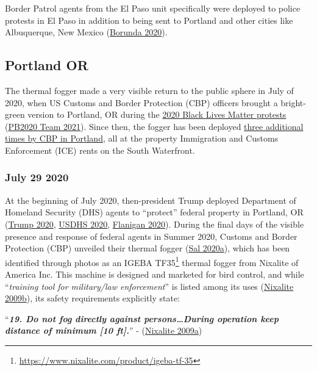 \documentclass[
  11pt,
]{krantz}
\renewenvironment{quote}{\begin{VF}}{\end{VF}}
\renewcommand{\href}[2]{#2\footnote{\url{#1}}}
\begin{document}
Border Patrol agents from the El Paso unit specifically were deployed to police protests in El Paso in addition to being sent to Portland and other cities like Albuquerque, New Mexico (\protect\hyperlink{ref-Borunda2020}{Borunda 2020}).

\hypertarget{PortlandOR2020_2021}{%
\subsection{Portland OR}\label{PortlandOR2020_2021}}

The thermal fogger made a very visible return to the public sphere in July of 2020, when US Customs and Border Protection (CBP) officers brought a bright-green version to Portland, OR during the \protect\hyperlink{PortlandOR2020_07_29}{2020 Black Lives Matter protests} (\protect\hyperlink{ref-pb20202021}{PB2020 Team 2021}).
Since then, the fogger has been deployed \protect\hyperlink{PortlandORICE2020_2021}{three additional times by CBP in Portland}, all at the property Immigration and Customs Enforcement (ICE) rents on the South Waterfront.

\hypertarget{PortlandOR2020_07_29}{%
\subsubsection{July 29 2020}\label{PortlandOR2020_07_29}}

At the beginning of July 2020, then-president Trump deployed Department of Homeland Security (DHS) agents to ``protect'' federal property in Portland, OR (\protect\hyperlink{ref-Trump2020}{Trump 2020}, \protect\hyperlink{ref-DHS2020}{USDHS 2020}, \protect\hyperlink{ref-Flanigan2020}{Flanigan 2020}).
During the final days of the visible presence and response of federal agents in Summer 2020, Customs and Border Protection (CBP) unveiled their thermal fogger (\protect\hyperlink{ref-Recompiler2020_07_29}{Sal 2020a}), which has been identified through photos as an \href{https://www.nixalite.com/product/igeba-tf-35}{IGEBA TF35} thermal fogger from Nixalite of America Inc.
This machine is designed and marketed for bird control, and while ``\emph{training tool for military/law enforcement}'' is listed among its uses (\protect\hyperlink{ref-Nixalite2009a}{Nixalite 2009b}), its safety requirements explicitly state:

\begin{quote}
``\emph{\textbf{19. Do not fog directly against persons\ldots During operation keep distance of minimum {[}10 ft{]}.}}'' - (\protect\hyperlink{ref-Nixalite2009b}{Nixalite 2009a})
\end{quote}
\end{document}
